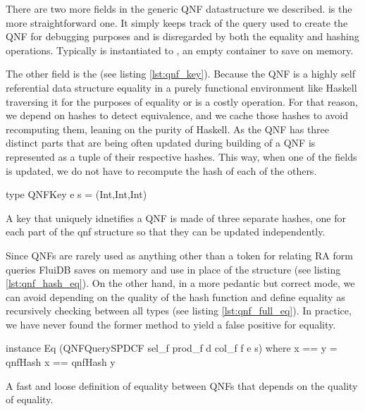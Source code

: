 There are two more fields in the generic QNF datastructure we
described.  is the more
straightforward one. It simply keeps track of the query used to create
the QNF for debugging purposes and is disregarded by both the equality
and hashing operations. Typically  is
instantiated to , an empty container to save on memory.

The other field is the  (see listing
\ref{lst:qnf_key}). Because the QNF is a highly self referential data
structure equality in a purely functional environment like Haskell traversing it
for the purposes of equality or is a costly operation.
For that reason, we depend on hashes to detect equivalence, and we
cache those hashes to avoid recomputing them, leaning on the
purity of Haskell. As the QNF has three distinct parts that
are being often updated during building of a QNF  is
represented as a tuple of their respective hashes. This way, when one of
the fields is updated, we do not have to recompute the hash of each of the others.

\begin{code}
  \begin{haskellcode}
    type QNFKey e s = (Int,Int,Int)
  \end{haskellcode}
  \caption{\label{lst:qnf_key}A key that uniquely idnetifies a QNF is
    made of three separate hashes, one for each part of the qnf
    structure so that they can be updated independently.}
\end{code}

Since QNFs are rarely used as anything other than a token for relating
RA form queries FluiDB saves on memory and use  in place
of the  structure (see listing
\ref{lst:qnf_hash_eq}). On the other hand, in a more pedantic but
correct mode, we can avoid depending on the quality of the hash
function and define equality as recursively checking between all types
(see listing \ref{lst:qnf_full_eq}). In practice, we have never found the
former method to yield a false positive for equality.

\begin{code}
  \begin{haskellcode}
    instance Eq (QNFQuerySPDCF sel_f prod_f d col_f f e s) where
      x == y = qnfHash x == qnfHash y
  \end{haskellcode}
  \caption{\label{lst:qnf_hash_eq}A fast and loose definition of
    equality between QNFs that depends on the quality of equality.}
\end{code}

